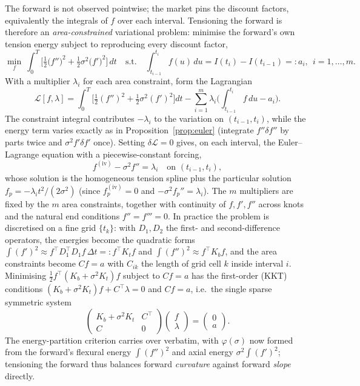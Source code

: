 \documentclass[]{interact}
\theoremstyle{plain}
\begin{document}
The forward is not observed pointwise; the market pins the discount factors, equivalently the
integrals of $f$ over each interval. Tensioning the forward is therefore an \emph{area-constrained}
variational problem: minimise the forward's own tension energy subject to reproducing every
discount factor,
\begin{equation}
\min_{f}\ \int_{0}^{T}\!\Big[\tfrac12\big(f''\big)^2+\tfrac12\sigma^2\big(f'\big)^2\Big]\,dt
\quad\text{s.t.}\quad
\int_{t_{i-1}}^{t_i} f(u)\,du = I(t_i)-I(t_{i-1})=:a_i,\ \ i=1,\dots,m.
\label{eq:fwdmin}
\end{equation}
With a multiplier $\lambda_i$ for each area constraint, form the Lagrangian
\[
\mathcal{L}[f,\lambda]=\int_0^T\!\Big[\tfrac12(f'')^2+\tfrac12\sigma^2(f')^2\Big]dt
-\sum_{i=1}^m\lambda_i\Big(\int_{t_{i-1}}^{t_i}\!f\,du-a_i\Big).
\]
The constraint integral contributes $-\lambda_i$ to the variation on $(t_{i-1},t_i)$, while the
energy term varies exactly as in Proposition~\ref{prop:euler} (integrate $f''\delta f''$ by parts
twice and $\sigma^2 f'\delta f'$ once). Setting $\delta\mathcal{L}=0$ gives, on each interval, the
Euler--Lagrange equation with a piecewise-constant forcing,
\begin{equation}
f^{(\mathrm{iv})}-\sigma^2 f''=\lambda_i \quad\text{on } (t_{i-1},t_i),
\end{equation}
whose solution is the homogeneous tension spline plus the particular solution
$f_p=-\lambda_i t^2/(2\sigma^2)$ (since $f_p^{(\mathrm{iv})}=0$ and $-\sigma^2 f_p''=\lambda_i$).
The $m$ multipliers are fixed by the $m$ area constraints, together with continuity of
$f,f',f''$ across knots and the natural end conditions $f''=f'''=0$. In practice the problem is
discretised on a fine grid $\{t_k\}$: with $D_1,D_2$ the first- and second-difference operators,
the energies become the quadratic forms $\int(f')^2\approx f^{\!\top}\!D_1^{\!\top}D_1 f\,\Delta t=:f^{\!\top}\!K_t f$
and $\int(f'')^2\approx f^{\!\top}\!K_b f$, and the area constraints become $Cf=a$ with $C_{ik}$ the
length of grid cell $k$ inside interval $i$. Minimising $\tfrac12 f^{\!\top}(K_b+\sigma^2K_t)f$
subject to $Cf=a$ has the first-order (KKT) conditions $(K_b+\sigma^2K_t)f+C^{\!\top}\lambda=0$ and
$Cf=a$, i.e.\ the single sparse symmetric system
\begin{equation}
\begin{pmatrix} K_b+\sigma^2 K_t & C^{\!\top}\\ C & 0\end{pmatrix}
\begin{pmatrix} f\\ \lambda\end{pmatrix}=\begin{pmatrix}0\\ a\end{pmatrix}.
\end{equation}
The energy-partition criterion carries over verbatim, with $\varphi(\sigma)$ now formed from
the forward's flexural energy $\int(f'')^2$ and axial energy $\sigma^2\int(f')^2$; tensioning
the forward thus balances forward \emph{curvature} against forward \emph{slope} directly.
\end{document}
